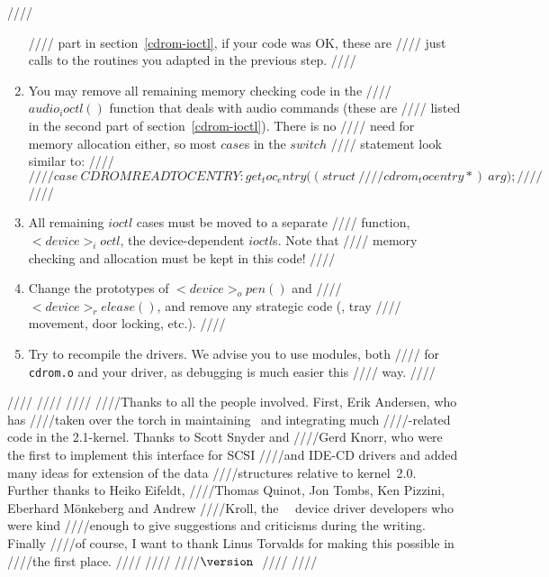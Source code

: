 ////\documentclass{article}
\begin{document}
\begin{enumerate}
////  part in section~\ref{cdrom-ioctl}, if your code was OK, these are
////  just calls to the routines you adapted in the previous step.
////\item You may remove all remaining memory checking code in the
////  $audio_ioctl()$ function that deals with audio commands (these are
////  listed in the second part of section~\ref{cdrom-ioctl}). There is no
////  need for memory allocation either, so most $case$s in the $switch$
////  statement look similar to:
////  $$
////  case\ CDROMREADTOCENTRY\colon get_toc_entry\bigl((struct\ 
////  cdrom_tocentry *{})\ arg\bigr);
////  $$
////\item All remaining $ioctl$ cases must be moved to a separate
////  function, $<device>_ioctl$, the device-dependent $ioctl$s. Note that
////  memory checking and allocation must be kept in this code!
////\item Change the prototypes of $<device>_open()$ and
////  $<device>_release()$, and remove any strategic code (\ie, tray
////  movement, door locking, etc.).
////\item Try to recompile the drivers. We advise you to use modules, both
////  for {\tt {cdrom.o}} and your driver, as debugging is much easier this
////  way.
////\end{enumerate} 
////
////
////
////Thanks to all the people involved.  First, Erik Andersen, who has
////taken over the torch in maintaining \cdromc\ and integrating much
////\cdrom-related code in the 2.1-kernel.  Thanks to Scott Snyder and
////Gerd Knorr, who were the first to implement this interface for SCSI
////and IDE-CD drivers and added many ideas for extension of the data
////structures relative to kernel~2.0.  Further thanks to Heiko Ei{\sz}feldt,
////Thomas Quinot, Jon Tombs, Ken Pizzini, Eberhard M\"onkeberg and Andrew
////Kroll, the \linux\ \cdrom\ device driver developers who were kind
////enough to give suggestions and criticisms during the writing. Finally
////of course, I want to thank Linus Torvalds for making this possible in
////the first place.
////
////\vfill
////$ \version\ $
////\eject
////
\end{document}
